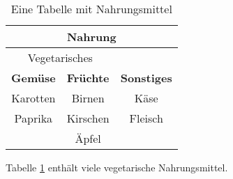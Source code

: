 \documentclass[varwidth]{standalone}
\begin{document}
~\vspace{0.1cm}
\begin{table}[htb]
	\centering
	\begin{tabular}{|c|c|c|}
		\hline	\multicolumn{3}{|c|}{Nahrung} \\
		\hline	\multicolumn{2}{|c|}{Vegetarisches} & \\
		\hline	\textbf{Gemüse} & \textbf{Früchte}   & \textbf{Sonstiges} \\
		\hline	Karotten & Birnen  &  Käse\\
		\hline	Paprika & Kirschen  & Fleisch \\
		\hline	& Äpfel &  \\
		\hline
	\end{tabular}
	\caption{Eine Tabelle mit Nahrungsmittel}
	\label{tab:nahrungsmittel}
\end{table}
Tabelle \ref{tab:nahrungsmittel} enthält viele vegetarische Nahrungsmittel. 
\end{document}
